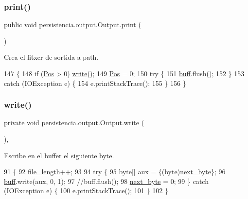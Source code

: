 \subsubsection{\texorpdfstring{print()}{print()}}
{\footnotesize\ttfamily public void persistencia.\+output.\+Output.\+print (\begin{DoxyParamCaption}{ }\end{DoxyParamCaption})\hspace{0.3cm}{\ttfamily [inline]}}



Crea el fitxer de sortida a path. 


\begin{DoxyCode}
147     \{
148         \textcolor{keywordflow}{if} (\hyperlink{classpersistencia_1_1output_1_1Output_a3709182600423f7e57644ccdd0016f22}{Pos} > 0) \hyperlink{classpersistencia_1_1output_1_1Output_a57be8c4ed429f03caa5c2bcc97e2260d}{write}();
149         \hyperlink{classpersistencia_1_1output_1_1Output_a3709182600423f7e57644ccdd0016f22}{Pos} = 0;
150         \textcolor{keywordflow}{try} \{
151             \hyperlink{classpersistencia_1_1output_1_1Output_ae8f22fd92b020c318f6f377cf3ac39de}{buff}.flush();
152         \}
153         \textcolor{keywordflow}{catch} (IOException e) \{
154             e.printStackTrace();
155         \}
156     \}
\end{DoxyCode}
\mbox{\label{classpersistencia_1_1output_1_1Output_a57be8c4ed429f03caa5c2bcc97e2260d}} 
\subsubsection{\texorpdfstring{write()}{write()}}
{\footnotesize\ttfamily private void persistencia.\+output.\+Output.\+write (\begin{DoxyParamCaption}{ }\end{DoxyParamCaption})\hspace{0.3cm}{\ttfamily [inline]}, {\ttfamily [private]}}



Escribe en el buffer el siguiente byte. 


\begin{DoxyCode}
91                          \{
92         \hyperlink{classpersistencia_1_1output_1_1Output_a028761929614fdc2b88f9ebe0e2313ef}{file\_length}++;
93 
94         \textcolor{keywordflow}{try} \{
95             byte[] aux = \{(byte)\hyperlink{classpersistencia_1_1output_1_1Output_aca83082ef84ec2e169b6fa34618d0773}{next\_byte}\};
96             \hyperlink{classpersistencia_1_1output_1_1Output_ae8f22fd92b020c318f6f377cf3ac39de}{buff}.write(aux, 0, 1);
97             \textcolor{comment}{//buff.flush();}
98             \hyperlink{classpersistencia_1_1output_1_1Output_aca83082ef84ec2e169b6fa34618d0773}{next\_byte} = 0;
99         \} \textcolor{keywordflow}{catch} (IOException e) \{
100             e.printStackTrace();
101         \}
102     \}
\end{DoxyCode}


